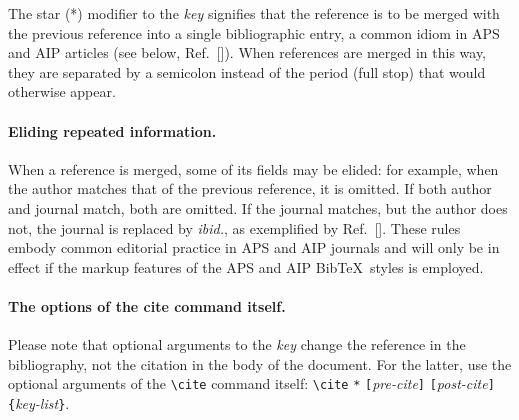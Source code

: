 \documentclass[%
 preprint, linenumbers,
 amsmath,amssymb,
 aps, physrev,
pra,
]{revtex4-2}
\begin{document}
The star (*) modifier to the \emph{key} signifies that the reference is to be 
merged with the previous reference into a single bibliographic entry, 
a common idiom in APS and AIP articles (see below, Ref.~[]). 
When references are merged in this way, they are separated by a semicolon instead of 
the period (full stop) that would otherwise appear.

\paragraph{Eliding repeated information.}
When a reference is merged, some of its fields may be elided: for example, 
when the author matches that of the previous reference, it is omitted. 
If both author and journal match, both are omitted.
If the journal matches, but the author does not, the journal is replaced by \emph{ibid.},
as exemplified by Ref.~[]. 
These rules embody common editorial practice in APS and AIP journals and will only
be in effect if the markup features of the APS and AIP Bib\TeX\ styles is employed.

\paragraph{The options of the cite command itself.}
Please note that optional arguments to the \emph{key} change the reference in the bibliography, 
not the citation in the body of the document. 
For the latter, use the optional arguments of the \verb+\cite+ command itself:
\verb+\cite+ \texttt{*}\allowbreak
\texttt{[}\emph{pre-cite}\texttt{]}\allowbreak
\texttt{[}\emph{post-cite}\texttt{]}\allowbreak
\verb+{+\emph{key-list}\verb+}+.
\end{document}
